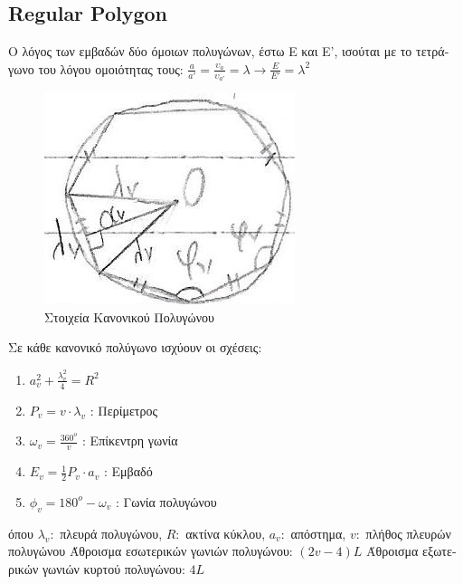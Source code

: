\documentclass[12pt]{article}
\begin{document}
\begin{flushleft}
	\subsection{Regular Polygon}	

	\textbullet \quad \textgreek{Ο λόγος των εμβαδών δύο όμοιων πολυγώνων, έστω Ε και Ε', ισούται με το τετράγωνο του λόγου ομοιότητας τους:} $\displaystyle \frac{a}{a'} = \frac{\upsilon_a}{\upsilon_{a'}} =\lambda \longrightarrow \frac{E}{E'} = \lambda^2 $ \linebreak 
	
	\begin{figure}[H]
	\centering
	\includegraphics[scale=2]{poligono}
	\caption{\textgreek{Στοιχεία Κανονικού Πολυγώνου}}
	\label{fig:poligono}
	\end{figure}
	
	\textgreek{Σε κάθε κανονικό πολύγωνο ισχύουν οι σχέσεις:}
	\begin{enumerate}
	\item $\displaystyle a_v^2 + \frac{\lambda_v^2}{4} = R^2 $ 
	\item $\displaystyle  P_v = v\cdot \lambda_v $ \textgreek{: Περίμετρος} 
	\item $\displaystyle  \omega_v = \frac{360^o}{v} $ \textgreek{: Επίκεντρη γωνία} 
	\item $\displaystyle  E_v = \frac{1}{2} P_v \cdot a_v $ \textgreek{: Εμβαδό}  
	\item $\displaystyle  \phi_v = 180^o -\omega_v $ \textgreek{: Γωνία πολυγώνου} 
	\end{enumerate}		
	
	\textgreek{όπου} $\lambda_v:$ \textgreek{πλευρά πολυγώνου}, $R:$ \textgreek{ακτίνα κύκλου}, $a_v:$ \textgreek{απόστημα}, $v:$ \textgreek{πλήθος πλευρών πολυγώνου} \linebreak 
	\textbullet \quad \textgreek{Άθροισμα εσωτερικών γωνιών πολυγώνου}: $(2v-4)L$ \linebreak 
	\textbullet \quad \textgreek{Άθροισμα εξωτερικών γωνιών κυρτού πολυγώνου}: $4L$ \linebreak
	

\end{flushleft}
\end{document}
